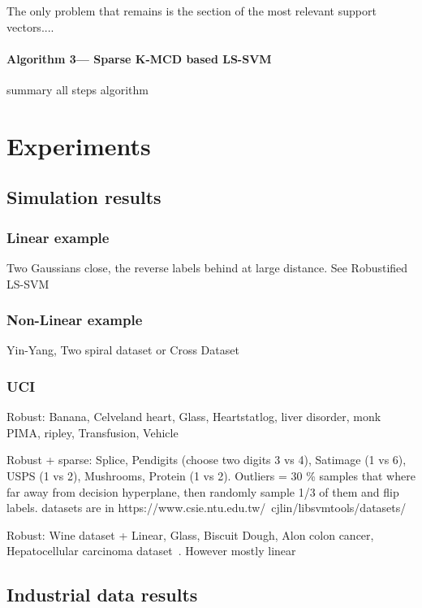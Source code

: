 \documentclass[preprint,12pt]{elsarticle}
\begin{document}
The only problem that remains is the section of the most relevant support vectors....

\paragraph{Algorithm 3--- Sparse K-MCD based LS-SVM}

summary all steps algorithm

\section{Experiments} 
\subsection{Simulation results} 

\subsubsection{Linear example}

Two Gaussians close, the reverse labels behind at large distance. See Robustified LS-SVM~\cite{debruyne2009robustified}

\subsubsection{Non-Linear example}

Yin-Yang, Two spiral dataset or Cross Dataset~\cite{yang2014robust}

\subsubsection{UCI}

Robust: Banana, Celveland heart, Glass, Heartstatlog, liver disorder, monk PIMA, ripley, Transfusion, Vehicle~\cite{yang2014robust}

Robust + sparse: Splice, Pendigits (choose two digits 3 vs 4), Satimage (1 vs 6), USPS (1 vs 2), Mushrooms, Protein (1 vs 2).\cite{chen2018sparse}
Outliers = 30 \% samples that where far away from decision hyperplane, then randomly sample 1/3 of them and flip labels. datasets are in https://www.csie.ntu.edu.tw/~cjlin/libsvmtools/datasets/ 

Robust: Wine dataset + Linear, Glass, Biscuit Dough, Alon colon cancer, Hepatocellular carcinoma dataset~\cite{debruyne2009robustified}. However mostly linear

\subsection{Industrial data results} 
\end{document}
